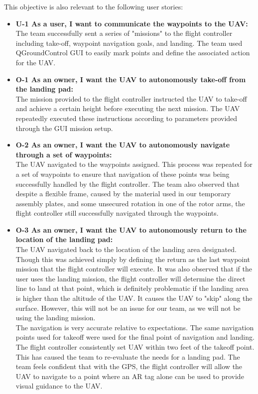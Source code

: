 \begin{itemize}
This objective is also relevant to the following user stories:
\begin{itemize}
\item \textbf{U-1 As a user, I want to communicate the waypoints to the UAV:} \\
The team successfully sent a series of "missions" to the flight controller including take-off, waypoint navigation goals, and landing. The team used QGroundControl GUI to easily mark points and define the associated action for the UAV.
\item \textbf{O-1 As an owner, I want the UAV to autonomously take-off from the landing pad:} \\
The mission provided to the flight controller instructed the UAV to take-off and achieve a certain height before executing the next mission. The UAV repeatedly executed these instructions according to parameters provided through the GUI mission setup.
\item \textbf{O-2 As an owner, I want the UAV to autonomously navigate through a set of waypoints:} \\
The UAV navigated to the waypoints assigned. This process was repeated for a set of waypoints to ensure that navigation of these points was being successfully handled by the flight controller. The team also observed that despite a flexible frame, caused by the material used in our temporary assembly plates, and some unsecured rotation in one of the rotor arms, the flight controller still successfully navigated through the waypoints.
\item \textbf{O-3 As an owner, I want the UAV to autonomously return to the location of the landing pad:} \\
The UAV navigated back to the location of the landing area designated. Though this was achieved simply by defining the return as the last waypoint mission that the flight controller will execute. It was also observed that if the user uses the landing mission, the flight controller will determine the direct line to land at that point, which is definitely problematic if the landing area is higher than the altitude of the UAV. It causes the UAV to "skip" along the surface. However, this will not be an issue for our team, as we will not be using the landing mission. \\
The navigation is very accurate relative to expectations. The same navigation points used for takeoff were used for the final point of navigation and landing. The flight controller consistently set UAV within two feet of the takeoff point. This has caused the team to re-evaluate the needs for a landing pad. The team feels confident that with the GPS, the flight controller will allow the UAV to navigate to a point where an AR tag alone can be used to provide visual guidance to the UAV.
\end{itemize} 
\end{itemize}


